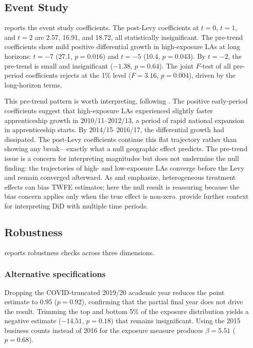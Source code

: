 \documentclass[12pt]{article}
\begin{document}


\subsection{Event Study}

 reports the event study coefficients. The post-Levy coefficients at $t=0$, $t=1$, and $t=2$ are 2.57, 16.91, and 18.72, all statistically insignificant. The pre-trend coefficients show mild positive differential growth in high-exposure LAs at long horizons: $t=-7$ (27.1, $p=0.016$) and $t=-5$ (10.4, $p=0.043$). By $t=-2$, the pre-trend is small and insignificant ($-1.38$, $p=0.64$). The joint $F$-test of all pre-period coefficients rejects at the 1\% level ($F=3.16$, $p=0.004$), driven by the long-horizon terms.

This pre-trend pattern is worth interpreting, following \citet{roth2022}. The positive early-period coefficients suggest that high-exposure LAs experienced slightly faster apprenticeship growth in 2010/11--2012/13, a period of rapid national expansion in apprenticeship starts. By 2014/15--2016/17, the differential growth had dissipated. The post-Levy coefficients continue this flat trajectory rather than showing any break---exactly what a null geographic effect predicts. The pre-trend issue is a concern for interpreting magnitudes but does not undermine the null finding: the trajectories of high- and low-exposure LAs converge before the Levy and remain converged afterward. As \citet{goodman2021} and \citet{dechaisemartin2020} emphasize, heterogeneous treatment effects can bias TWFE estimates; here the null result is reassuring because the bias concern applies only when the true effect is non-zero. \citet{callaway2021} provide further context for interpreting DiD with multiple time periods.



\subsection{Robustness}

 reports robustness checks across three dimensions.

\subsubsection*{Alternative specifications} Dropping the COVID-truncated 2019/20 academic year reduces the point estimate to 0.95 ($p = 0.92$), confirming that the partial final year does not drive the result. Trimming the top and bottom 5\% of the exposure distribution yields a negative estimate ($-14.51$, $p = 0.18$) that remains insignificant. Using the 2015 business counts instead of 2016 for the exposure measure produces $\beta = 5.51$ ($p = 0.68$).
\end{document}
